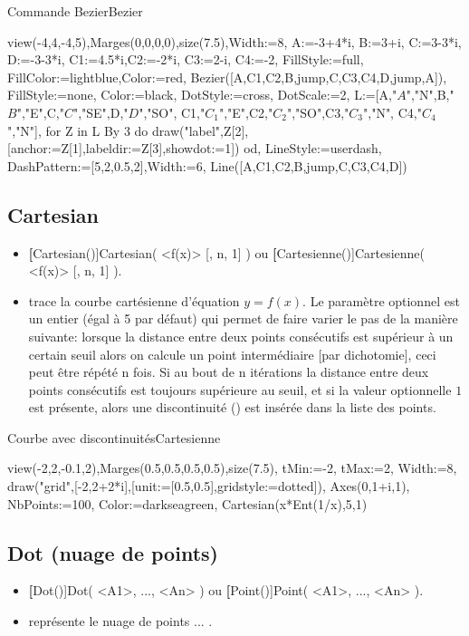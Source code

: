 \begin{demo}{Commande Bezier}{Bezier}
\begin{texgraph}[name=Bezier]
view(-4,4,-4,5),Marges(0,0,0,0),size(7.5),Width:=8,
A:=-3+4*i, B:=3+i, C:=3-3*i, D:=-3-3*i,
C1:=4.5*i,C2:=-2*i, C3:=2-i, C4:=-2,
FillStyle:=full, FillColor:=lightblue,Color:=red,
Bezier([A,C1,C2,B,jump,C,C3,C4,D,jump,A]),
FillStyle:=none, Color:=black, DotStyle:=cross, DotScale:=2,
L:=[A,"$A$","N",B,"$B$","E",C,"$C$","SE",D,"$D$","SO",
C1,"$C_1$","E",C2,"$C_2$","SO",C3,"$C_3$","N",
C4,"$C_4$","N"],
for Z in L By 3 do
 draw("label",Z[2],[anchor:=Z[1],labeldir:=Z[3],showdot:=1])
od,
LineStyle:=userdash, DashPattern:=[5,2,0.5,2],Width:=6,
Line([A,C1,C2,B,jump,C,C3,C4,D])
\end{texgraph}
\end{demo}

\subsection{Cartesian}\label{cmdCartesienne}
\begin{itemize}
 \item \util \textbf[Cartesian()]{Cartesian( <f(x)> [, n, 1] )} ou \textbf[Cartesienne()]{Cartesienne( <f(x)> [, n, 1] )}.
 \item \desc trace la courbe cartésienne d'équation $y=f(x)$. Le paramètre optionnel  est un entier (égal à 5 par défaut) qui permet de faire varier le pas de la manière suivante: lorsque la distance entre deux points consécutifs est supérieur à un certain seuil alors on calcule un point intermédiaire [par dichotomie], ceci peut être répété n fois. Si au bout de n itérations la distance entre deux points consécutifs est toujours supérieure au seuil, et si la valeur optionnelle $1$ est présente, alors une discontinuité (\jump) est insérée dans la liste des points.
\end{itemize}

\begin{demo}{Courbe avec discontinuités}{Cartesienne}
\begin{texgraph}[name=Cartesienne]
view(-2,2,-0.1,2),Marges(0.5,0.5,0.5,0.5),size(7.5),
tMin:=-2, tMax:=2, Width:=8,
draw("grid",[-2,2+2*i],[unit:=[0.5,0.5],gridstyle:=dotted]),
Axes(0,1+i,1), NbPoints:=100, Color:=darkseagreen,
Cartesian(x*Ent(1/x),5,1)
\end{texgraph}
\end{demo}

\subsection{Dot (nuage de points)}\label{cmdPoint}
\begin{itemize}
 \item \util \textbf[Dot()]{Dot( <A1>, ..., <An> )} ou \textbf[Point()]{Point( <A1>, ..., <An> )}.
 \item \desc représente le nuage de points  ... .
\end{itemize}

